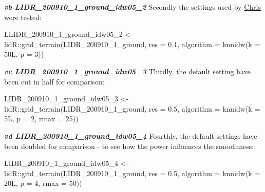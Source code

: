 \documentclass[
  12pt,
]{article}
\newenvironment{Shaded}{\begin{snugshade}}{\end{snugshade}}
\newcommand{\AttributeTok}[1]{\textcolor[rgb]{0.77,0.63,0.00}{#1}}
\newcommand{\DecValTok}[1]{\textcolor[rgb]{0.00,0.00,0.81}{#1}}
\newcommand{\FloatTok}[1]{\textcolor[rgb]{0.00,0.00,0.81}{#1}}
\newcommand{\FunctionTok}[1]{\textcolor[rgb]{0.00,0.00,0.00}{#1}}
\newcommand{\NormalTok}[1]{#1}
\newcommand{\OtherTok}[1]{\textcolor[rgb]{0.56,0.35,0.01}{#1}}
\newcommand{\SpecialCharTok}[1]{\textcolor[rgb]{0.00,0.00,0.00}{#1}}
\begin{document}
\textbf{\emph{vb LIDR\_200910\_1\_ground\_idw05\_2}}
\newline
Secondly the settings used by \href{https://github.com/gisma/uavRst/wiki/Building-a-Canopy-Height-Model-(CHM)-using-lidR}{Chris} were tested:

\begin{Shaded}
\begin{Highlighting}[]
\NormalTok{LLIDR\_200910\_1\_ground\_idw05\_2 }\OtherTok{\textless{}{-}}\NormalTok{ lidR}\SpecialCharTok{::}\FunctionTok{grid\_terrain}\NormalTok{(LIDR\_200910\_1\_ground, }\AttributeTok{res =} \FloatTok{0.1}\NormalTok{,}
    \AttributeTok{algorithm =} \FunctionTok{knnidw}\NormalTok{(}\AttributeTok{k =}\NormalTok{ 50L, }\AttributeTok{p =} \DecValTok{3}\NormalTok{))}
\end{Highlighting}
\end{Shaded}

\textbf{\emph{vc LIDR\_200910\_1\_ground\_idw05\_3}}
\newline
Thirdly, the default setting have been cut in half for comparison:

\begin{Shaded}
\begin{Highlighting}[]
\NormalTok{LIDR\_200910\_1\_ground\_idw05\_3 }\OtherTok{\textless{}{-}}\NormalTok{ lidR}\SpecialCharTok{::}\FunctionTok{grid\_terrain}\NormalTok{(LIDR\_200910\_1\_ground, }\AttributeTok{res =} \FloatTok{0.5}\NormalTok{,}
    \AttributeTok{algorithm =} \FunctionTok{knnidw}\NormalTok{(}\AttributeTok{k =}\NormalTok{ 5L, }\AttributeTok{p =} \DecValTok{2}\NormalTok{, }\AttributeTok{rmax =} \DecValTok{25}\NormalTok{))}
\end{Highlighting}
\end{Shaded}

\textbf{\emph{vd LIDR\_200910\_1\_ground\_idw05\_4}}
\newline
Fourthly, the default settings have been doubled for comparison - to see how the power influences the smoothness:

\begin{Shaded}
\begin{Highlighting}[]
\NormalTok{LIDR\_200910\_1\_ground\_idw05\_4 }\OtherTok{\textless{}{-}}\NormalTok{ lidR}\SpecialCharTok{::}\FunctionTok{grid\_terrain}\NormalTok{(LIDR\_200910\_1\_ground, }\AttributeTok{res =} \FloatTok{0.5}\NormalTok{,}
    \AttributeTok{algorithm =} \FunctionTok{knnidw}\NormalTok{(}\AttributeTok{k =}\NormalTok{ 20L, }\AttributeTok{p =} \DecValTok{4}\NormalTok{, }\AttributeTok{rmax =} \DecValTok{50}\NormalTok{))}
\end{Highlighting}
\end{Shaded}
\end{document}
